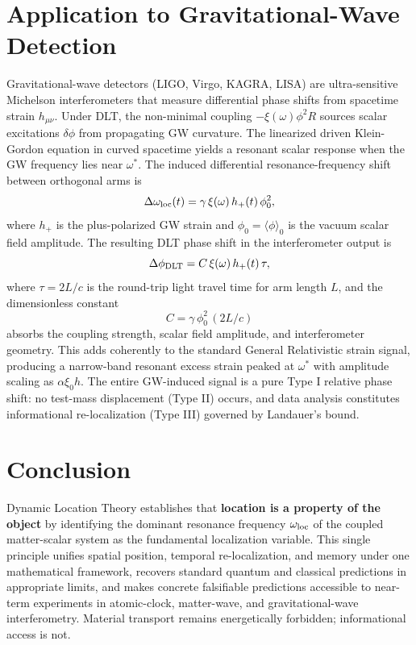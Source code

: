 \documentclass[conference,letterpaper,10pt]{IEEEtran}
\begin{document}
\section{Application to Gravitational-Wave Detection}
Gravitational-wave detectors (LIGO, Virgo, KAGRA, LISA) are ultra-sensitive Michelson interferometers that measure
differential phase shifts from spacetime strain \(h_{\mu\nu}\). Under DLT, the non-minimal coupling \(-\xi(\omega)\phi^2
R\) sources scalar excitations \(\delta\phi\) from propagating GW curvature. The linearized driven Klein-Gordon equation
in curved spacetime yields a resonant scalar response when the GW frequency lies near \(\omega^*\).
The induced differential resonance-frequency shift between orthogonal arms is
\begin{equation}
\Delta\omega_{\rm loc}(t) = \gamma\,\xi(\omega)\,h_+(t)\,\phi_0^2,
\label{eq:gw-deltaomega}
\end{equation}
where \(h_+\) is the plus-polarized GW strain and \(\phi_0 = \langle\phi\rangle_0\) is the vacuum scalar field amplitude.
The resulting DLT phase shift in the interferometer output is
\begin{equation}
\Delta\phi_{\rm DLT} = C\,\xi(\omega)\,h_+(t)\,\tau,
\label{eq:gw-phase}
\end{equation}
where \(\tau = 2L/c\) is the round-trip light travel time for arm length \(L\), and the dimensionless constant
\begin{equation}
C = \gamma\,\phi_0^2\,(2L/c)
\label{eq:gw-constant}
\end{equation}
absorbs the coupling strength, scalar field amplitude, and interferometer geometry. This adds coherently to the
standard General Relativistic strain signal, producing a narrow-band resonant excess strain peaked at \(\omega^*\) with
amplitude scaling as \(\alpha\xi_0 h\).
The entire GW-induced signal is a pure Type I relative phase shift: no test-mass displacement (Type II) occurs, and
data analysis constitutes informational re-localization (Type III) governed by Landauer's bound.

\section{Conclusion}
Dynamic Location Theory establishes that \textbf{location is a property of the object} by identifying the dominant
resonance frequency \(\omega_{\rm loc}\) of the coupled matter-scalar system as the fundamental localization variable.
This single principle unifies spatial position, temporal re-localization, and memory under one mathematical framework,
 recovers standard quantum and classical predictions in appropriate limits, and makes concrete falsifiable predictions
 accessible to near-term experiments in atomic-clock, matter-wave, and gravitational-wave interferometry. Material
transport remains energetically forbidden; informational access is not.
\end{document}
